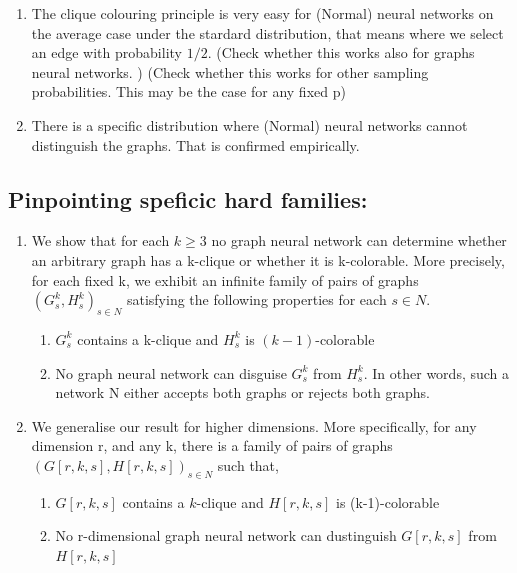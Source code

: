 \begin{enumerate}
    \item The clique colouring principle is very easy for (Normal) neural networks on the average case under the stardard distribution, that means where we select an edge with probability $1/2$. 
         (Check whether this works also for graphs neural networks. )
         (Check whether this works for other sampling probabilities. This may be the case for any fixed p)
         
    \item There is a specific distribution where (Normal) neural networks cannot distinguish the graphs. That is confirmed empirically.
        
\end{enumerate}


\subsection{Pinpointing speficic hard families:} 

\begin{enumerate}
    \item We show that for each $k\geq3$ no graph neural network can determine whether an arbitrary graph has a k-clique or whether it is k-colorable. More precisely, for each fixed k, we exhibit an 
infinite family of pairs of graphs ${(G_s^k,H_s^k)}_{s\in N}$  satisfying the following properties for each $s\in N$. 
    \begin{enumerate}
        \item $G_s^k$ contains a k-clique and $H_s^k$ is $(k-1)$-colorable
        \item No graph neural network can disguise $G_s^k$ from $H_s^k$. In other words, such a network N either accepts both graphs or rejects both graphs.
    \end{enumerate}
    \item We generalise our result for higher dimensions. More specifically, for any dimension r, and any k, there is a family of pairs of graphs ${(G[r,k,s],H[r,k,s])}_{s\in N}$ such that,
    \begin{enumerate}
        \item $G[r,k,s]$ contains a $k$-clique and $H[r,k,s]$ is (k-1)-colorable 
        \item No r-dimensional graph neural network can dustinguish $G[r,k,s]$ from $H[r,k,s]$
    \end{enumerate}
\end{enumerate}


